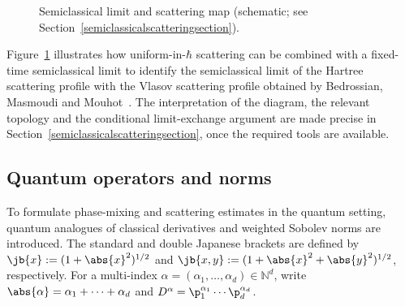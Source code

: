 \begin{figure}[ht]
\vspace{0cm}
\centering
{}
\captionsetup{width=.8\linewidth}
\caption{Semiclassical limit and scattering map (schematic; see Section~\ref{semiclassicalscatteringsection}).}
\label{map}
\end{figure}
Figure~\ref{map} illustrates how uniform-in-$\hbar$ scattering can be combined with a fixed-time semiclassical limit to identify the semiclassical limit of the Hartree scattering profile with the Vlasov scattering profile obtained by Bedrossian, Masmoudi and Mouhot~\cite{BedrossianMasmoudiMouhot2018}. The interpretation of the diagram, the relevant topology and the conditional limit-exchange argument are made precise in Section~\ref{semiclassicalscatteringsection}, once the required tools are available.

\subsection{Quantum operators and norms} To formulate phase-mixing and scattering estimates in the quantum setting, quantum analogues of classical derivatives and weighted Sobolev norms are introduced. The standard and double Japanese brackets are defined by $\jb{x}:=(1+\abs{x}^2)^{1/2}$ and $\jb{x,y}:=(1+\abs{x}^2+\abs{y}^2)^{1/2}$, respectively. For a multi-index $\alpha=(\alpha_1,\dots,\alpha_d)\in\mathbb N^d$, write
$\abs{\alpha}=\alpha_1+\dots+\alpha_d$ and $D^{\alpha}=\p_1^{\alpha_1}\cdots\p_d^{\alpha_d}$.

